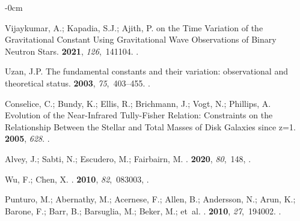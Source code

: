\documentclass[universe,article,accept,moreauthors,pdftex]{Definitions/mdpi}
\begin{document}
\begin{adjustwidth}{-\extralength}{0cm}
\begin{thebibliography}{999}
Vijaykumar, A.; Kapadia, S.J.; Ajith, P.
 on the Time Variation of the Gravitational Constant Using
  Gravitational Wave Observations of Binary Neutron Stars.
 {\bf 2021}, {\em 126},~141104.
\newblock
{\href{https://doi.org/10.1103/physrevlett.126.141104}{}}.

Uzan, J.P.
\newblock The fundamental constants and their variation: observational and
  theoretical status.
 {\bf 2003}, {\em 75},~403--455.
\newblock
 {\href{https://doi.org/10.1103/revmodphys.75.403}{}}.

Conselice, C.; Bundy, K.; Ellis, R.; Brichmann, J.; Vogt, N.; Phillips, A.
\newblock Evolution of the Near-Infrared Tully-Fisher Relation: Constraints on
  the Relationship Between the Stellar and Total Masses of Disk Galaxies since
  z=1.
 {\bf 2005}, {\em 628}.
\newblock
{\href{https://doi.org/10.1086/430589}{}}.

Alvey, J.; Sabti, N.; Escudero, M.; Fairbairn, M.
.
 {\bf 2020}, {\em 80},~148,
{\href{https://doi.org/10.1140/epjc/s10052-020-7727-y}{}}.

Wu, F.; Chen, X.
.
 {\bf 2010}, {\em 82},~083003,
{\href{https://doi.org/10.1103/PhysRevD.82.083003}{}}.

Punturo, M.; Abernathy, M.; Acernese, F.; Allen, B.; Andersson, N.; Arun, K.; Barone, F.; Barr, B.; Barsuglia, M.; Beker, M.;  et~al.
.
 {\bf 2010}, {\em 27},~194002.
\newblock
{\href{https://doi.org/10.1088/0264-9381/27/19/194002}{}}.


\end{thebibliography}
\end{adjustwidth}
\end{document}
